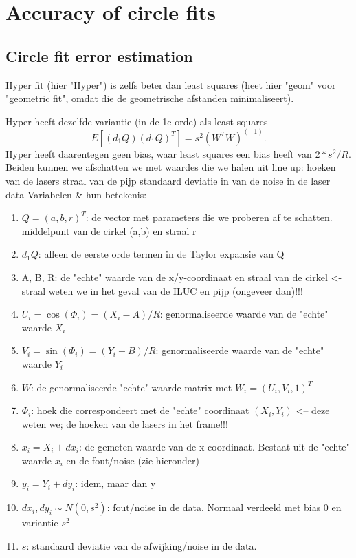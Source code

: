 \section{Accuracy of circle fits} \label{sec:accuracy}

\subsection{Circle fit error estimation}
\cite{alsharadqah_chernov_circle_fitting}
Hyper fit (hier "Hyper") is zelfs beter dan least squares (heet hier "geom" voor "geometric fit", omdat die de geometrische afstanden minimaliseert).

Hyper heeft dezelfde variantie (in de 1e orde) als least squares
\[
    E[(d_1Q)(d_1Q)^T] = s^2 (W^T W)^(-1).
\]
Hyper heeft daarentegen geen bias, waar least squares een bias heeft van $2 * s^2/R$. Beiden kunnen we afschatten we met waardes die we halen uit line up:
hoeken van de lasers
straal van de pijp
standaard deviatie in van de noise in de laser data
Variabelen \& hun betekenis:
\begin{enumerate}
    \item $Q = (a, b, r)^T$: de vector met parameters die we proberen af te schatten. middelpunt van de cirkel (a,b) en straal r
    \item $d_1Q$:  alleen de eerste orde termen in de Taylor expansie van Q
    \item A, B, R: de "echte" waarde van de x/y-coordinaat en straal van de cirkel <- straal weten we in het geval van de ILUC en pijp (ongeveer dan)!!!
    \item $U_i = \cos(\Phi_i) = (X_i-A)/R$: genormaliseerde waarde van de "echte" waarde  $X_i$
    \item $V_i = \sin(\Phi_i) = (Y_i-B)/R$: genormaliseerde waarde van de "echte" waarde  $Y_i$
    \item $W$: de genormaliseerde "echte" waarde matrix met $W_i = (U_i, V_i, 1)^T$
    \item $\Phi_i$: hoek die correspondeert met de "echte" coordinaat $(X_i, Y_i)$ <-- deze weten we; de hoeken van de lasers in het frame!!!
    \item $x_i = X_i + dx_i$: de gemeten waarde van de x-coordinaat. Bestaat uit de "echte" waarde $x_i$ en de fout/noise (zie hieronder)
    \item $y_i = Y_i + dy_i$: idem, maar dan y
    \item $dx_i, dy_i \sim N(0, s^2)$: fout/noise in de data. Normaal verdeeld met bias 0 en variantie $s^2$
    \item $s$: standaard deviatie van de afwijking/noise in de data.
\end{enumerate}
